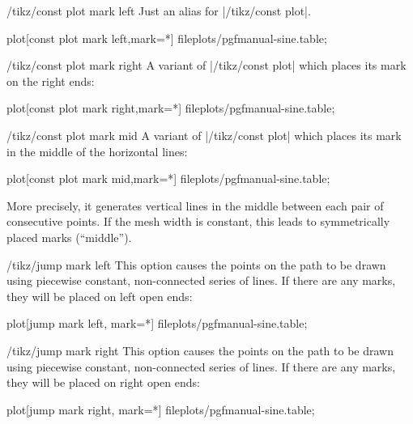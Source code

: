 \begin{key}{/tikz/const plot mark left}
    Just an alias for |/tikz/const plot|.
\begin{codeexample}[]
\tikz\draw plot[const plot mark left,mark=*] file{plots/pgfmanual-sine.table};
\end{codeexample}
\end{key}

\begin{key}{/tikz/const plot mark right}
    A variant of |/tikz/const plot| which places its mark on the right ends:
\begin{codeexample}[]
\tikz\draw plot[const plot mark right,mark=*] file{plots/pgfmanual-sine.table};
\end{codeexample}
\end{key}

\begin{key}{/tikz/const plot mark mid}
    A variant of |/tikz/const plot| which places its mark in the middle of the
    horizontal lines:
\begin{codeexample}[]
\tikz\draw plot[const plot mark mid,mark=*] file{plots/pgfmanual-sine.table};
\end{codeexample}
    More precisely, it generates vertical lines in the middle between each pair
    of consecutive points. If the mesh width is constant, this leads to
    symmetrically placed marks (``middle'').
\end{key}

\begin{key}{/tikz/jump mark left}
    This option causes the points on the path to be drawn using piecewise
    constant, non-connected series of lines. If there are any marks, they will
    be placed on left open ends:
\begin{codeexample}[]
\tikz\draw plot[jump mark left, mark=*] file{plots/pgfmanual-sine.table};
\end{codeexample}
\end{key}

\begin{key}{/tikz/jump mark right}
    This option causes the points on the path to be drawn using piecewise
    constant, non-connected series of lines. If there are any marks, they will
    be placed on right open ends:
\begin{codeexample}[]
\tikz\draw plot[jump mark right, mark=*] file{plots/pgfmanual-sine.table};
\end{codeexample}
\end{key}

